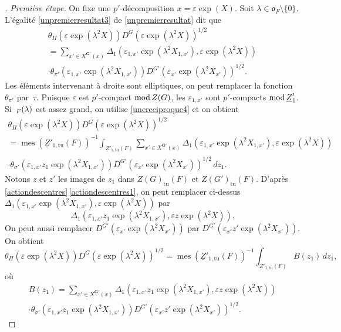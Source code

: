 \documentclass[JEP,XML,SOM,Unicode,francais]{cedram}
\newcommand{\NoChangel}[1]{%
\expandafter\let\csname old\string#1\endcsname=#1
\let#1=\relax
\newcommand{#1}{\mathcode`l="716C\csname old\string#1\endcsname\mathcode`l="7160 }%
}
\let\epsilon\varepsilon
\newcommand{\rmod}{\textup{mod}\,}
\newcommand{\fro}{\mathfrak{o}}
\newcommand{\tu}{\mathrm{tu}}
\DeclareMathOperator{\mes}{mes}
\DeclareMathOperator{\val}{val} \NoChangel{\val}
\newcommand{\bG}{\boldsymbol{G}}
\theoremstyle{plain}
\theoremstyle{definition}
\begin{document}
\begin{proof}[\proofname. Première étape]
On fixe une $p'$-décomposition $x=\epsilon \exp(X)$. Soit $\lambda\in \fro_{F}\setminus\{0\}$.
L'égalité \eqref{unpremierresultat3} de \ref{unpremierresultat} dit que
\begin{multline*}
\theta_{\Pi}( \epsilon \exp(\lambda^2X))D^G(\epsilon \exp(\lambda^2X))^{1/2}\\
=\sum_{x'\in X^{\bG'}(x)}\Delta_{1}(\epsilon_{1,x'}\exp(\lambda^2X_{1,x'}),\epsilon \exp(\lambda^2X))
\\[-8pt]
\cdot\theta_{\pi'}(\epsilon_{1,x'}\exp(\lambda^2X_{1,x'}))D^{G'}(\epsilon_{x'}\exp(\lambda^2X_{x'}))^{1/2}.
\end{multline*}
Les éléments intervenant à droite sont elliptiques, on peut remplacer la fonction~$\theta_{\pi'}$ par~$\tau$. Puisque $\epsilon$ est $p'$-compact $\rmod Z(G)$, les $\epsilon_{1,x'}$ sont $p'$-compacts $\rmod \underline{Z}'_{1}$. Si~$\val_{F}(\lambda)$ est assez grand, on utilise \eqref{unereciproque4} et on obtient
\begin{multline*}
\theta_{\Pi}( \epsilon \exp(\lambda^2X))D^G(\epsilon \exp(\lambda^2X))^{1/2}\\
=\mes(\underline{Z}'_{1,\tu}(F))^{-1}\int_{\underline{Z}'_{1,\tu}(F)}\sum_{x'\in X^{\bG'}(x)} \Delta_{1}(\epsilon_{1,x'}\exp(\lambda^2X_{1,x'}),\epsilon \exp(\lambda^2X))\\
\cdot\theta_{\sigma'}(\epsilon_{1,x'}z_{1}\exp(\lambda^2X_{1,x'}))D^{G'}(\epsilon_{x'}\exp(\lambda^2X_{x'}))^{1/2}\,dz_{1}.
\end{multline*}
Notons $z$ et $z'$ les images de $z_{1}$ dans $Z(G)_{\tu}(F)$ et $ Z(G')_{\tu}(F)$. D'après \ref{actiondescentres}\,\eqref{actiondescentres1}, on peut remplacer ci-dessus $\Delta_{1}(\epsilon_{1,x'}\exp(\lambda^2X_{1,x'}),\epsilon \exp(\lambda^2X))$ par
\[
\Delta_{1}(\epsilon_{1,x'}z_{1}\exp(\lambda^2X_{1,x'}),\epsilon z \exp(\lambda^2X)).
\]
On peut aussi remplacer $D^{G'}(\epsilon_{x'}\exp(\lambda^2X_{x'}))$ par $D^{G'}(\epsilon_{x'}z'\exp(\lambda^2X_{x'}))$. On obtient%
\begin{equation}\tag{7}\label{unereciproque7}
\theta_{\Pi}( \epsilon \exp(\lambda^2X))D^G(\epsilon \exp(\lambda^2X))^{1/2}=\mes(\underline{Z}'_{1,\tu}(F))^{-1}\int_{\underline{Z}'_{1,\tu}(F)}B(z_{1})\,dz_{1},
\end{equation}
où
\begin{multline*}
B(z_{1})=\sum_{x'\in X^{\bG'}(x)}\Delta_{1}(\epsilon_{1,x'}z_{1}\exp(\lambda^2X_{1,x'}),\epsilon z \exp(\lambda^2X))
\\[-8pt]
\cdot\theta_{\sigma'}(\epsilon_{1,x'}z_{1}\exp(\lambda^2X_{1,x'}))D^{G'}(\epsilon_{x'}z'\exp(\lambda^2X_{x'}))^{1/2}.

\end{multline*}
\end{proof}
\end{document}
